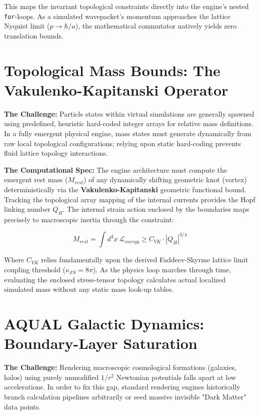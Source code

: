 This maps the invariant topological constraints directly into the engine's nested \texttt{for}-loops. As a simulated wavepacket's momentum approaches the lattice Nyquist limit ($p \to \hbar/a$), the mathematical commutator natively yields zero translation bounds.

\section{Topological Mass Bounds: The Vakulenko-Kapitanski Operator}

\textbf{The Challenge:} Particle states within virtual simulations are generally spawned using predefined, heuristic hard-coded integer arrays for relative mass definitions. In a fully emergent physical engine, mass states must generate dynamically from raw local topological configurations; relying upon static hard-coding prevents fluid lattice topology interactions.

\textbf{The Computational Spec:} The engine architecture must compute the emergent rest mass ($M_{rest}$) of any dynamically shifting geometric knot (vortex) deterministically via the \textbf{Vakulenko-Kapitanski} geometric functional bound. Tracking the topological array mapping of the internal currents provides the Hopf linking number $Q_H$. The internal strain action enclosed by the boundaries maps precisely to macroscopic inertia through the constraint:

\begin{equation}
    M_{rest} = \int d^3x \ \mathcal{L}_{energy} \geq C_{VK} \cdot |Q_H|^{3/4}
\end{equation}

Where $C_{VK}$ relies fundamentally upon the derived Faddeev-Skyrme lattice limit coupling threshold ($\kappa_{FS} = 8\pi$). As the physics loop marches through time, evaluating the enclosed stress-tensor topology calculates actual localized simulated mass without any static mass look-up tables.

\section{AQUAL Galactic Dynamics: Boundary-Layer Saturation}

\textbf{The Challenge:} Rendering macroscopic cosmological formations (galaxies, halos) using purely unmodified $1/r^2$ Newtonian potentials falls apart at low accelerations. In order to fix this gap, standard rendering engines historically branch calculation pipelines arbitrarily or seed massive invisible "Dark Matter" data points. 

